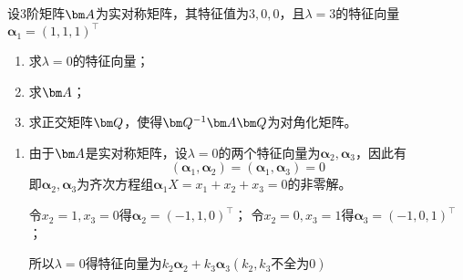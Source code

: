 \begin{example}
    设$3$阶矩阵$\mat{A}$为实对称矩阵，其特征值为$3,0,0$，且$\lambda=3$的特征向量$\bm{\alpha}_1 = (1,1,1)^\intercal$
    \begin{enumerate}[(1)]
        \item 求$\lambda=0$的特征向量；
        \item 求$\mat{A}$；
        \item 求正交矩阵$\mat{Q}$，使得$\mat{Q}^{-1}\mat{A}\mat{Q}$为对角化矩阵。
    \end{enumerate}
\end{example}
\begin{solution}
    \begin{enumerate}[(1)]
        \item 由于$\mat{A}$是实对称矩阵，设$\lambda=0$的两个特征向量为$\bm{\alpha}_2,\bm{\alpha}_3$，因此有
              \[ (\bm{\alpha}_1,\bm{\alpha}_2) = (\bm{\alpha}_1,\bm{\alpha}_3) = 0 \]
              即$\bm{\alpha}_2,\bm{\alpha}_3$为齐次方程组$\bm{\alpha}_1X=x_1+x_2+x_3=0$的非零解。

              令$x_2=1,x_3=0$得$\bm{\alpha}_2 =(-1,1,0)^\intercal$；
              令$x_2=0,x_3=1$得$\bm{\alpha}_3=(-1,0,1)^\intercal$；

              所以$\lambda=0$得特征向量为$k_2\bm{\alpha}_2+k_3\bm{\alpha}_3 (k_2,k_3\text{不全为}0)$


\end{enumerate}
\end{solution}

